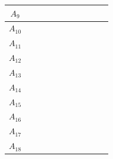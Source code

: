 \documentclass[11pt]{report}
\begin{document}
\begin{table}[h!]
\begin{tabular}{| c | c | c | c | c | c | c | c | c | c | c |}
    \small{$A_9$}  & \cellcolor{train} & \cellcolor{train} & \cellcolor{train} & \cellcolor{train} & \cellcolor{train} & \cellcolor{train} & \cellcolor{test}  & \cellcolor{train} & \cellcolor{train} &  \cellcolor{train} \\ \hline
    \small{$A_{10}$} & \cellcolor{train} & \cellcolor{test}  & \cellcolor{train} & \cellcolor{train} & \cellcolor{train} & \cellcolor{train} & \cellcolor{train} & \cellcolor{train} & \cellcolor{train} &  \cellcolor{train} \\ \hline
    \small{$A_{11}$} & \cellcolor{train} & \cellcolor{train} & \cellcolor{train} & \cellcolor{train} & \cellcolor{train} & \cellcolor{train} & \cellcolor{train} & \cellcolor{train} & \cellcolor{train} & \cellcolor{test}  \\ \hline
    \small{$A_{12}$} & \cellcolor{train} & \cellcolor{train} & \cellcolor{train} & \cellcolor{train} & \cellcolor{train} & \cellcolor{train} & \cellcolor{train} & \cellcolor{train} & \cellcolor{train} &  \cellcolor{train} \\ \hline
    \small{$A_{13}$} & \cellcolor{train} & \cellcolor{train} & \cellcolor{train} & \cellcolor{train} & \cellcolor{train} & \cellcolor{train} & \cellcolor{train} & \cellcolor{train} & \cellcolor{train} &  \cellcolor{train} \\ \hline
    \small{$A_{14}$} & \cellcolor{train} & \cellcolor{train} & \cellcolor{train} & \cellcolor{train} & \cellcolor{test}  & \cellcolor{train} & \cellcolor{train} & \cellcolor{train} & \cellcolor{train} &  \cellcolor{train} \\ \hline
    \small{$A_{15}$} & \cellcolor{train} & \cellcolor{train} & \cellcolor{test}  & \cellcolor{train} & \cellcolor{train} & \cellcolor{train} & \cellcolor{train} & \cellcolor{train} & \cellcolor{train} & \cellcolor{test}  \\ \hline
    \small{$A_{16}$} & \cellcolor{train} & \cellcolor{train} & \cellcolor{train} & \cellcolor{train} & \cellcolor{train} & \cellcolor{train} & \cellcolor{train} & \cellcolor{train} & \cellcolor{train} &  \cellcolor{train} \\ \hline
    \small{$A_{17}$} & \cellcolor{train} & \cellcolor{train} & \cellcolor{train} & \cellcolor{train} & \cellcolor{train} & \cellcolor{train} & \cellcolor{train} & \cellcolor{train} & \cellcolor{train} &  \cellcolor{train} \\ \hline
    \small{$A_{18}$} & \cellcolor{train} & \cellcolor{train} & \cellcolor{train} & \cellcolor{train} & \cellcolor{train} & \cellcolor{train} & \cellcolor{train} & \cellcolor{train} & \cellcolor{train} &  \cellcolor{train} \\ \hline

\end{tabular}
\end{table}
\end{document}
